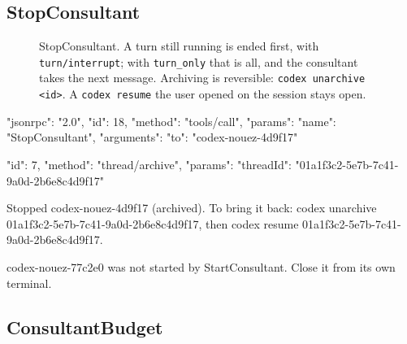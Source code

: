 \documentclass[10pt,a4paper]{article}
\newcommand{\lifelines}[2]{%
  \foreach \x/\name/\col in {#1} {%
    \node[actor, draw=\col, text=\col] at (\x,0) {\name};
    \draw[lifeline] (\x,-0.4) -- (\x,-#2);
  }}
\newcommand{\msg}[4]{\draw[call] (#2,-#1) -- node[above=1pt,lbl]{#4} (#3,-#1);}
\newcommand{\ret}[4]{\draw[reply] (#2,-#1) -- node[above=1pt,lbl]{#4} (#3,-#1);}
\newcommand{\side}[3]{\node[note, anchor=west] at (#2+0.15,-#1) {#3};}
\newcommand{\code}[1]{\texttt{#1}}
\begin{document}
\subsection{StopConsultant}

\begin{figure}[H]
\centering
{}
\caption{StopConsultant. A turn still running is ended first, with \code{turn/interrupt}; with
\code{turn\_only} that is all, and the consultant takes the next message. Archiving is reversible:
\code{codex unarchive <id>}. A \code{codex resume} the user opened on the session stays open.}
\end{figure}

\begin{wire}[Request]
{"jsonrpc": "2.0", "id": 18, "method": "tools/call", "params": {"name": "StopConsultant", "arguments": {"to": "codex-nouez-4d9f17"}}}
\end{wire}
\begin{wire}
{"id": 7, "method": "thread/archive", "params": {"threadId": "01a1f3c2-5e7b-7c41-9a0d-2b6e8c4d9f17"}}
\end{wire}
\begin{plain}
Stopped codex-nouez-4d9f17 (archived). To bring it back: codex unarchive 01a1f3c2-5e7b-7c41-9a0d-2b6e8c4d9f17, then codex resume 01a1f3c2-5e7b-7c41-9a0d-2b6e8c4d9f17.
\end{plain}
\begin{plain}
codex-nouez-77c2e0 was not started by StartConsultant. Close it from its own terminal.
\end{plain}

\subsection{ConsultantBudget}
\label{sec:budget}
\end{document}
